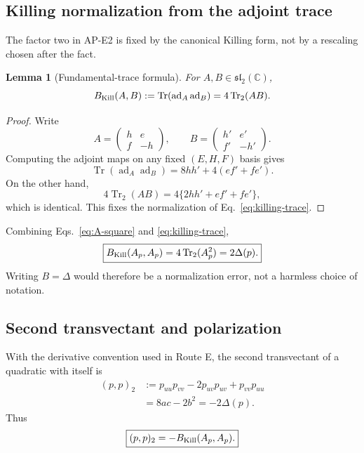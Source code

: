 \documentclass[11pt]{article}
\numberwithin{equation}{section}
\newcommand{\sltwo}{\mathfrak{sl}_2(\mathbb C)}
\newcommand{\Tr}{\operatorname{Tr}}
\newcommand{\ad}{\operatorname{ad}}
\newtheorem{lemma}[theorem]{Lemma}
\begin{document}
\subsection{Killing normalization from the adjoint trace}

The factor two in AP-E2 is fixed by the canonical Killing form, not by a
rescaling chosen after the fact.

\begin{lemma}[Fundamental-trace formula]
For \(A,B\in\sltwo\),
\begin{equation}
 B_{\rm Kill}(A,B):=\Tr(\ad_A\ad_B)=4\Tr_2(AB).
 \label{eq:killing-trace}
\end{equation}
\end{lemma}

\begin{proof}
Write
\begin{equation}
 A=\begin{pmatrix}h&e\\f&-h\end{pmatrix},
 \qquad
 B=\begin{pmatrix}h'&e'\\f'&-h'\end{pmatrix}.
\end{equation}
Computing the adjoint maps on any fixed \((E,H,F)\) basis gives
\begin{equation}
 \Tr(\ad_A\ad_B)
 =8hh'+4(ef'+fe').
\end{equation}
On the other hand,
\begin{equation}
 4\Tr_2(AB)=4\{2hh'+ef'+fe'\},
\end{equation}
which is identical.  This fixes the normalization of
Eq.~\eqref{eq:killing-trace}.
\end{proof}

Combining Eqs.~\eqref{eq:A-square} and \eqref{eq:killing-trace},
\begin{equation}
 \boxed{
 B_{\rm Kill}(A_p,A_p)
 =4\Tr_2(A_p^2)
 =2\Delta(p).}
 \label{eq:killing-discriminant}
\end{equation}
Writing \(B=\Delta\) would therefore be a normalization error, not a harmless
choice of notation.

\subsection{Second transvectant and polarization}

With the derivative convention used in Route E, the second transvectant of a
quadratic with itself is
\begin{align}
 (p,p)_2
 &:=p_{uu}p_{vv}-2p_{uv}p_{uv}+p_{vv}p_{uu}\\
 &=8ac-2b^2=-2\Delta(p).
 \label{eq:self-transvectant}
\end{align}
Thus
\begin{equation}
 \boxed{(p,p)_2=-B_{\rm Kill}(A_p,A_p).}
 \label{eq:transvectant-killing}
\end{equation}
\end{document}
